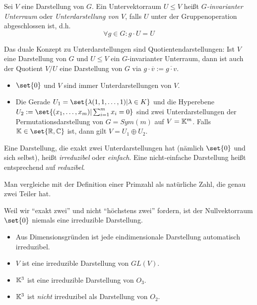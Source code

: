 \begin{definition}[Unterdarstellungen]
Sei $V$ eine Darstellung von $G$. Ein Untervektorraum $U\leq V$ heißt \emph{$G$-invarianter Unterraum} oder \emph{Unterdarstellung von $V$}, falls $U$ unter der Gruppenoperation abgeschlossen ist, d.h.
\[\forall g\in G: g\cdot U = U\]
\end{definition}

\begin{lemma}[Quotienten]
Das duale Konzept zu Unterdarstellungen sind Quotientendarstellungen: Ist $V$ eine Darstellung von $G$ und $U\leq V$ ein $G$-invarianter Unterraum, dann ist auch der Quotient $V/U$ eine Darstellung von $G$ via $g\cdot\overline{v} := \overline{g\cdot v}$.
\end{lemma}

\begin{example}
\begin{itemize}
\item $\set{0}$ und $V$ sind immer Unterdarstellungen von $V$.
\item Die Gerade $U_1=\set{\lambda(1,1,\ldots,1) | \lambda\in K}$ und die Hyperebene $U_2 := \set{(x_1,\ldots,x_m) | \sum_{i=1}^m x_i = 0}$ sind zwei Unterdarstellungen der Permutationsdarstellung von $G=Sym(m)$ auf $V=\mathbb{K}^m$. Falls $\IK\in\set{\IR,\IC}$ ist, dann gilt $V=U_1\oplus U_2$.
\end{itemize}
\end{example}

\begin{definition}
Eine Darstellung, die exakt zwei Unterdarstellungen hat (nämlich $\set{0}$ und sich selbst), heißt \emph{irreduzibel} oder \emph{einfach}. Eine nicht-einfache Darstellung heißt entsprechend auf \emph{reduzibel}.
\end{definition}

\begin{remark}
Man vergleiche mit der Definition einer Primzahl als natürliche Zahl, die genau zwei Teiler hat.
\end{remark}

\begin{remark}
Weil wir \enquote{exakt zwei} und nicht \enquote{höchstens zwei} fordern, ist der Nullvektorraum $\set{0}$ niemals eine irreduzible Darstellung.
\end{remark}

\begin{example}
\begin{itemize}
\item Aus Dimensionsgründen ist jede eindimensionale Darstellung automatisch irreduzibel.
\item $V$ ist eine irreduzible Darstellung von $GL(V)$.
\item $\mathbb{K}^3$ ist eine irreduzible Darstellung von $O_3$.
\item $\mathbb{K}^3$ ist \emph{nicht} irreduzibel als Darstellung von $O_2$.
\end{itemize}
\end{example}

